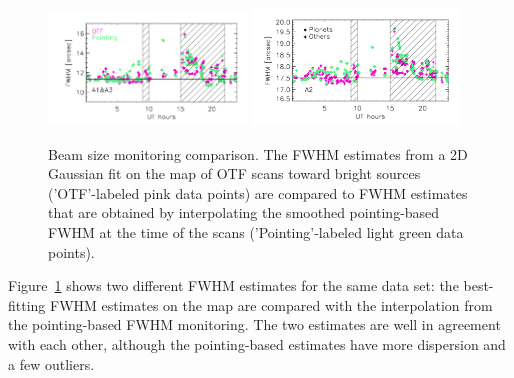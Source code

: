\begin{figure}[ht!]
  \begin{center}
    \includegraphics[clip=true, trim={0.9cm, 0.5cm, 0.5cm, 0.5cm}, width=0.4725\textwidth]{Figures/Beam_monitoring_with_otfs_vs_ut_compare_pointings_1mm.pdf}
    \includegraphics[clip=true, trim={0.5cm, 0.5cm, 0.5cm, 0.5cm}, width=0.4875\textwidth]{Figures/Beam_monitoring_with_otfs_vs_ut_compare_pointings_a2.pdf}
    \caption[Beam size monitoring comparison]{Beam size monitoring
      comparison. The FWHM estimates from a 2D Gaussian fit on the map
      of OTF scans toward bright sources ('OTF'-labeled pink data
      points) are compared to FWHM estimates that are obtained by
      interpolating the smoothed pointing-based FWHM at the time of
      the scans ('Pointing'-labeled light green data points).}
\label{fig:beam_monitoring_compare}
\end{center}
\end{figure}
%
Figure~\ref{fig:beam_monitoring_compare} shows two different FWHM
estimates for the same data set: the best-fitting FWHM estimates on
the map are compared with the interpolation from the pointing-based
FWHM monitoring. The two estimates are well in agreement with each
other, although the pointing-based estimates have more dispersion and
a few outliers.







